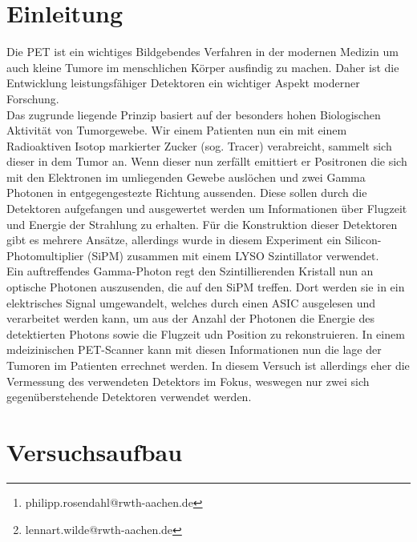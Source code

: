 \documentclass[12pt,twoside,a4paper]{scrartcl}
\author{Philipp Rosendahl Mat.-Nr: 378029\thanks{philipp.rosendahl@rwth-aachen.de}
		\and Lennart Wilde, Mat.-Nr: 381588\thanks{lennart.wilde@rwth-aachen.de}}
\begin{document}
\maketitle
\newpage

\tableofcontents
\newpage


\section{Einleitung}
	
	Die PET ist ein wichtiges Bildgebendes Verfahren in der modernen Medizin um auch kleine Tumore im menschlichen Körper ausfindig zu machen. Daher ist die Entwicklung leistungsfähiger Detektoren ein wichtiger Aspekt moderner Forschung. \\

	Das zugrunde liegende Prinzip basiert auf der besonders hohen Biologischen Aktivität von Tumorgewebe. Wir einem Patienten nun ein mit einem Radioaktiven Isotop markierter Zucker (sog. Tracer) verabreicht, sammelt sich dieser in dem Tumor an. Wenn dieser nun zerfällt emittiert er Positronen die sich mit den Elektronen im umliegenden Gewebe auslöchen und zwei Gamma Photonen in entgegengestezte Richtung aussenden. Diese sollen durch die Detektoren aufgefangen und ausgewertet werden um Informationen über Flugzeit und Energie der Strahlung zu erhalten. Für die Konstruktion dieser Detektoren gibt es mehrere Ansätze, allerdings wurde in diesem Experiment ein Silicon-Photomultiplier (SiPM) zusammen mit einem LYSO Szintillator verwendet.\\

	Ein auftreffendes Gamma-Photon regt den Szintillierenden Kristall nun an optische Photonen auszusenden, die auf den SiPM treffen. Dort werden sie in ein elektrisches Signal umgewandelt, welches durch einen ASIC ausgelesen und verarbeitet werden kann, um aus der Anzahl der Photonen die Energie des detektierten Photons sowie die Flugzeit udn Position zu rekonstruieren. In einem mdeizinischen PET-Scanner kann mit diesen Informationen nun die lage der Tumoren im Patienten errechnet werden. In diesem Versuch ist allerdings eher die Vermessung des verwendeten Detektors im Fokus, weswegen nur zwei sich gegenüberstehende Detektoren verwendet werden.

	\newpage

\section{Versuchsaufbau}
	
\end{document}
